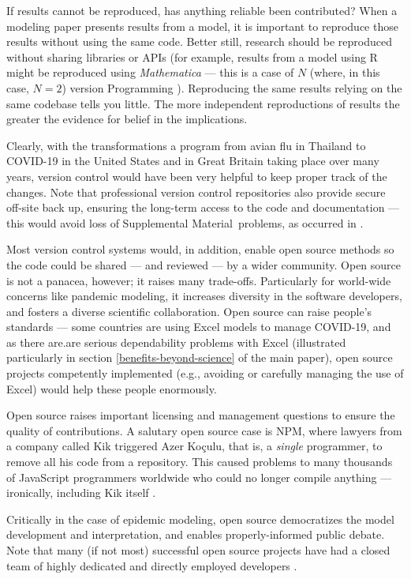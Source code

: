 \documentclass[10pt,a4paper]{article}
\def\supplement{Supplemental Material}
\begin{document}
{If results cannot be reproduced, has anything reliable been contributed? When a modeling paper presents results from a model, it is important to reproduce those results without using the same code. Better still, research should be reproduced without sharing libraries or APIs (for example, results from a model using R might be reproduced using \emph{Mathematica\/} --- this is a case of $N$ (where, in this case, $N=2$) version Programming \cite{NVP}). Reproducing the same results relying on the same codebase tells you little. The more independent reproductions of results the greater the evidence for belief in the implications.}

Clearly, with the transformations a program from avian flu in Thailand \cite{avianFluModel} to COVID-19 in the United States and in Great Britain \cite{ICmodel} taking place over many years, version control would have been very helpful to keep proper track of the changes. Note that professional version control repositories also provide secure off-site back up, ensuring the long-term access to the code and documentation --- this would avoid loss of \supplement\ problems, as occurred in \cite{flu-model}.

Most version control systems would, in addition, enable open source methods so the code could be shared --- and reviewed --- by a wider community. Open source is not a panacea, however; it raises many trade-offs. Particularly for world-wide concerns like pandemic modeling, it increases diversity in the software developers, and fosters a diverse scientific collaboration. Open source can raise people's standards --- some countries \cite{excel1,excel2} are using Excel models to manage COVID-19, and as there are.are serious dependability problems with Excel (illustrated particularly in section \ref{benefits-beyond-science} of the main paper), open source projects competently implemented (e.g., avoiding or carefully managing the use of Excel) would help these people enormously. 

Open source raises important licensing and management questions to ensure the quality of contributions. A salutary open source case is NPM, where lawyers from a company called Kik triggered Azer Ko\c{c}ulu, that is, a \emph{single\/} programmer, to remove all his code from a repository. This caused problems to many thousands of JavaScript programmers worldwide who could no longer compile anything --- ironically, including Kik itself \cite{npm}. 

Critically in the case of epidemic modeling, open source democratizes the model development and interpretation, and enables properly-informed public debate. Note that many (if not most) successful open source projects have had a closed team of highly dedicated and directly employed developers \cite{open-source}. 
\end{document}
